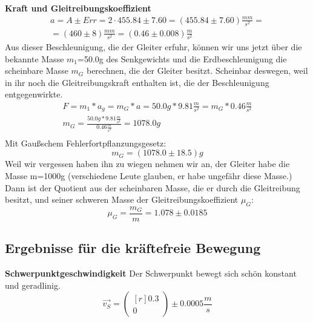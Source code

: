 \documentclass{article}
\begin{document}
\textbf{Kraft und Gleitreibungskoeffizient}
\begin{gather*}
a=A\pm Err=2\cdot 455.84 \pm 7.60=(455.84\pm 7.60)\frac{mm}{s^2}= \\
=(460\pm8)\frac{mm}{s^2}=(0.46\pm0.008)\frac{m}{s^2}
\end{gather*}
Aus dieser Beschleunigung, die der Gleiter erfuhr, können wir uns jetzt über die bekannte Masse $m_1$=50.0g des Senkgewichts und die Erdbeschleunigung die scheinbare Masse $m_G$ berechnen, die der Gleiter besitzt. Scheinbar deswegen, weil in ihr noch die Gleitreibungskraft enthalten ist, die der Beschleunigung entgegenwirkte.
\begin{gather}
F=m_1*a_g=m_G*a=50.0g*9.81\frac{m}{s^2}=m_G*0.46\frac{m}{s^2} \\
m_G=\frac{50.0g*9.81\frac{m}{s^2}}{0.46\frac{m}{s^2}}=1078.0g \\
\end{gather}
Mit Gaußschem Fehlerfortpflanzungsgesetz:
\begin{equation}
m_G=(1078.0 \pm18.5)g
\end{equation}
Weil wir vergessen haben ihn zu wiegen nehmen wir an, der Gleiter habe die Masse m=1000g (verschiedene Leute glauben, er habe ungefähr diese Masse.) Dann ist der Quotient aus der scheinbaren Masse, die er durch die Gleitreibung besitzt, und seiner schweren Masse der Gleitreibungskoeffizient $\mu_G$:
\begin{equation}
\mu_G=\frac{m_G}{m}=1.078\pm0.0185
\end{equation}


\subsection{Ergebnisse für die kräftefreie Bewegung}

\textbf{Schwerpunktgeschwindigkeit}
Der Schwerpunkt bewegt sich schön konstant und geradlinig.
\begin{equation}
\vec{v_S}=
\begin{pmatrix*}[r]
0.3 \\ 0
\end{pmatrix*}\pm 0.0005 \frac{m}{s}
\end{equation}
\end{document}
